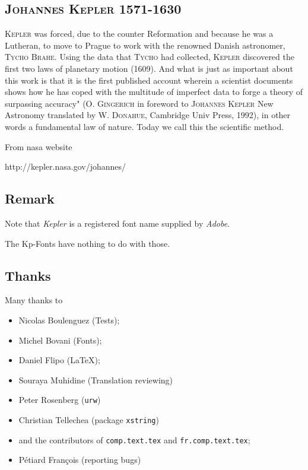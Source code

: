 \documentclass[a4paper,11pt]{article}
\begin{document}
\subsection{\textsc{Johannes Kepler 1571-1630}}

    \textsc{Kepler} was forced, due to the counter Reformation and because he was a Lutheran, to move to Prague to work with the renowned Danish astronomer, \textsc{Tycho Brahe}. Using the data that \textsc{Tycho} had collected, \textsc{Kepler} discovered the first two laws of planetary motion (1609). And what is just as important about this work is that it is the first published account wherein a scientist documents shows how he has coped with the multitude of imperfect data to forge a theory of surpassing accuracy" (\textsc{O. Gingerich} in foreword to \textsc{Johannes Kepler} New Astronomy translated by \textsc{W. Donahue}, Cambridge Univ Press, 1992), in other words a fundamental law of nature. Today we call this the scientific method.

From nasa website

http://kepler.nasa.gov/johannes/

\subsection{Remark}

Note that \textit{Kepler}\textregistered{} is a registered font name supplied by \textit{Adobe}\texttrademark. 

The Kp-Fonts have nothing to do with those.

\subsection{Thanks}

Many thanks to
\begin{itemize}
	\item Nicolas Boulenguez (Tests);
	\item Michel Bovani (Fonts);
	\item Daniel Flipo (\LaTeX);
	\item Souraya Muhidine (Translation reviewing)
	\item Peter Rosenberg (\texttt{urw})
	\item Christian Tellechea (package \texttt{xstring})
	\item and the contributors of \texttt{comp.text.tex} and \texttt{fr.comp.text.tex};
	\item Pétiard François (reporting bugs)
	\end{itemize}
	
\end{document}
